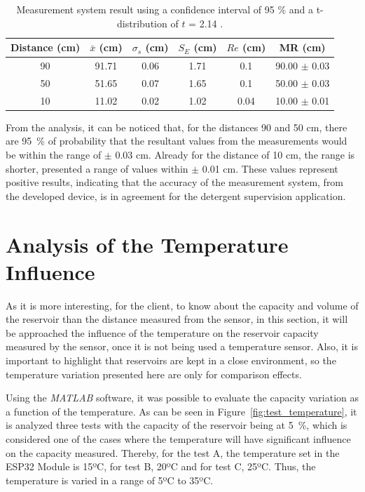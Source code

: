 \begin{table}[h!]
    \centering
    \begin{tabular}{@{}cccccc@{}}
        \toprule
        \textbf{Distance (cm)} & \textbf{$\bar{x}$ (cm)} & \textbf{$\sigma_s$ (cm)} & \textbf{$S_E$ (cm)} & \textbf{$Re$ (cm)} & \textbf{MR (cm)} \\ \midrule
        \rowcolor[HTML]{EFEFEF} 
        90 & 91.71 & 0.06 & 1.71 & 0.1 & 90.00 $\pm$ 0.03 \\
        50 & 51.65 & 0.07 & 1.65 & 0.1 & 50.00 $\pm$ 0.03 \\
        \rowcolor[HTML]{EFEFEF} 
        10 & 11.02 & 0.02 & 1.02 & 0.04 & 10.00 $\pm$ 0.01 \\ \bottomrule
    \end{tabular}
    \caption{Measurement system result using a confidence interval of 95 \% and a t-distribution of $t$ = 2.14 \cite{NETO:2012}.}
    \label{table:mr}
\end{table}

From the analysis, it can be noticed that, for the distances 90 and 50 cm, there are 95~\% of probability that the resultant values from the measurements would be within the range of $\pm$ 0.03 cm. Already for the distance of 10 cm, the range is shorter, presented a range of values within $\pm$ 0.01 cm. These values represent positive results, indicating that the accuracy of the measurement system, from the developed device, is in agreement for the detergent supervision application.


\section{Analysis of the Temperature Influence}\label{section:temperatureInfluence}

As it is more interesting, for the client, to know about the capacity and volume of the reservoir than the distance measured from the sensor, in this section, it will be approached the influence of the temperature on the reservoir capacity measured by the sensor, once it is not being used a temperature sensor. Also, it is important to highlight that reservoirs are kept in a close environment, so the temperature variation presented here are only for comparison effects.

Using the \textit{MATLAB} software, it was possible to evaluate the capacity variation as a function of the temperature. As can be seen in Figure~\ref{fig:test_temperature}, it is analyzed three tests with the capacity of the reservoir being at 5~\%, which is considered one of the cases where the temperature will have significant influence on the capacity measured. Thereby, for the test A, the temperature set in the ESP32 Module is 15ºC, for test B, 20ºC and for test C, 25ºC. Thus, the temperature is varied in a range of 5ºC to 35ºC.

